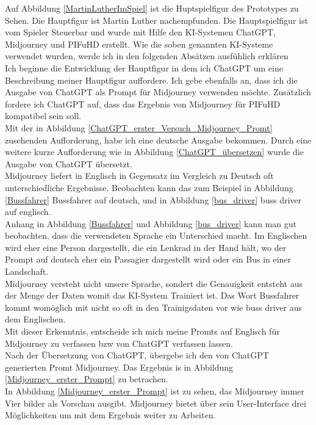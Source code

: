 \documentclass[10pt,a4paper,bibliography=totocnumbered,listof=totocnumbered]{scrartcl}
\begin{document}
Auf Abbildung \ref{MartinLutherImSpiel} ist die Huptspielfigur des Prototypes zu Sehen. Die Hauptfigur ist Martin Luther nachempfunden. Die Hauptspielfigur ist vom Spieler Steuerbar und wurde mit Hilfe den KI-Systemen ChatGPT, Midjourney und PIFuHD erstellt. Wie die soben genannten KI-Systeme verwendet wurden, werde ich in den folgenden Absätzen ausfühlich erklären
\\
Ich beginne die Entwicklung der Hauptfigur in dem ich ChatGPT um eine Beschreibung meiner Hauptfigur auffordere. Ich gebe ebenfalls an, dass ich die Ausgabe von ChatGPT als Prompt für Midjourney verwenden möchte. Zusätzlich fordere ich ChatGPT auf, dass das Ergebnis von Midjourney für PIFuHD kompatibel sein soll.
\\
Mit der in Abbildung \ref{ChatGPT_erster_Versuch_Midjourney_Promt} zusehenden Aufforderung, habe ich eine deutsche Ausgabe bekommen. Durch eine weitere kurze Aufforderung wie in Abbildung \ref{ChatGPT_übersetzen} wurde die Ausgabe von ChatGPT übersetzt.
\\
Midjourney liefert in Englisch in Gegensatz im Vergleich zu Deutsch oft unterschiedliche Ergebnisse. Beobachten kann das zum Beispiel in Abbildung \ref{Bussfahrer} Bussfahrer auf deutsch, und in Abbildung \ref{bus_driver} buss driver auf englisch.
\\
Anhang in Abbildung \ref{Bussfahrer} und Abbildung \ref{bus_driver} kann man gut beobachten, dass die verwendeten Sprache ein Unterschied macht. Im Englischen wird eher eine Person dargestellt, die ein Lenkrad in der Hand hält, wo der Prompt auf deutsch eher ein Passagier dargestellt wird oder ein Bus in einer Landschaft.
\\
Midjourney versteht nicht unsere Sprache, sondert die Genauigkeit entsteht aus der Menge der Daten womit das KI-System Trainiert ist. Das Wort Bussfahrer kommt womöglich mit nicht so oft in den Trainigsdaten vor wie buss driver aus dem Englischen.
\\
Mit dieser Erkenntnis, entscheide ich mich meine Promts auf Englisch für Midjourney zu verfassen bzw von ChatGPT verfassen lassen.
\\
Nach der Übersetzung von ChatGPT, übergebe ich den von ChatGPT generierten Promt Midjourney. Das Ergebnis is in Abbildung \ref{Midjourney_erster_Prompt} zu betrachen.
\\
In Abbildung \ref{Midjourney_erster_Prompt} ist zu sehen, das Midjourney immer Vier bilder als Vorschau ausgibt. Midjourney bietet über sein User-Interface drei Möglichkeiten um mit dem Ergebnis weiter zu Arbeiten.
\end{document}
